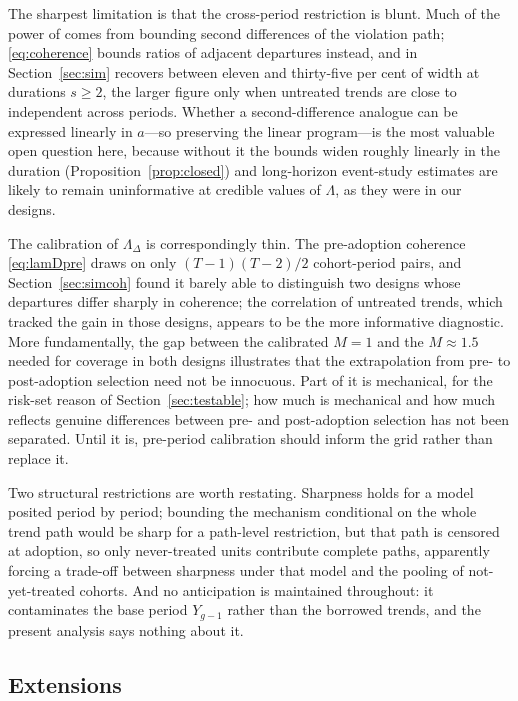\documentclass[12pt]{article}
\theoremstyle{remark}
\begin{document}
The sharpest limitation is that the cross-period restriction is blunt. Much of the power
of \citet{rambachan2023honest} comes from bounding second differences of the violation
path; \eqref{eq:coherence} bounds ratios of adjacent departures instead, and in
Section~\ref{sec:sim} recovers between eleven and thirty-five per cent of width at
durations $s \ge 2$, the larger figure only when untreated trends are close to independent
across periods. Whether a
second-difference analogue can be expressed linearly in $a$---so preserving the linear
program---is the most valuable open question here, because without it the bounds widen
roughly linearly in the duration (Proposition~\ref{prop:closed}) and long-horizon
event-study estimates are likely to remain uninformative at credible values of $\Lambda$,
as they were in our designs.

The calibration of $\Lambda_\Delta$ is correspondingly thin. The pre-adoption coherence
\eqref{eq:lamDpre} draws on only $(T{-}1)(T{-}2)/2$ cohort-period pairs, and
Section~\ref{sec:simcoh} found it barely able to distinguish two designs whose departures
differ sharply in coherence; the correlation of untreated trends, which tracked the gain in
those designs, appears to be the more informative diagnostic. More fundamentally, the gap
between the calibrated $M = 1$ and the $M \approx 1.5$ needed for coverage in both designs
illustrates that the extrapolation from pre- to post-adoption selection need not be
innocuous. Part of it is mechanical, for the risk-set reason
of Section~\ref{sec:testable}; how much is mechanical and how much reflects genuine
differences between pre- and post-adoption selection has not been separated. Until it is,
pre-period calibration should inform the grid rather than replace it.

Two structural restrictions are worth restating. Sharpness holds for a model posited
period by period; bounding the mechanism conditional on the whole trend path would be
sharp for a path-level restriction, but that path is censored at adoption, so only
never-treated units contribute complete paths, apparently forcing a trade-off between
sharpness under that model and the pooling of not-yet-treated cohorts. And no anticipation
is maintained throughout: it contaminates the base period $Y_{g-1}$ rather than the
borrowed trends, and the present analysis says nothing about it.

\subsection{Extensions}
\end{document}
